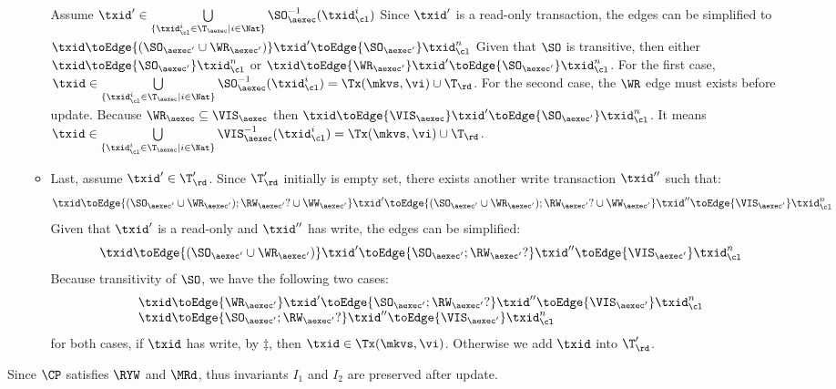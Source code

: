 \begin{itemize}
\begin{itemize}
    Assume  \( \txid' \in \bigcup\limits_{\{\txid_{\cl}^{i} \in \T_{\aexec} \mid i \in \Nat\}} \SO_{\aexec}^{-1}(\txid^i_\cl) \)
    Since \( \txid' \) is a read-only transaction, 
    the edges can be simplified to \( \txid \toEdge{(\SO_{\aexec'} \cup \WR_{\aexec'} )} \txid' \toEdge{\SO_{\aexec'}}  \txid_\cl^n \)
    Given that \( \SO \) is transitive, then  either \( \txid \toEdge{\SO_{\aexec'}} \txid_\cl^n \) or \( \txid \toEdge{\WR_{\aexec'} } \txid' \toEdge{\SO_{\aexec'}}  \txid_\cl^n \).
    For the first case, \( \txid \in \bigcup\limits_{\{\txid_{\cl}^{i} \in \T_{\aexec} \mid i \in \Nat\}} \SO_{\aexec}^{-1}(\txid^i_\cl) = \Tx(\mkvs, \vi) \cup \T_\rd \).
    For the second case, the \( \WR \) edge must exists before update.
    Because \( \WR_\aexec \subseteq \VIS_\aexec \) then  \( \txid \toEdge{\VIS_{\aexec} } \txid' \toEdge{\SO_{\aexec'}}  \txid_\cl^n  \).
    It means \( \txid \in \bigcup\limits_{\{\txid_{\cl}^{i} \in \T_{\aexec} \mid i \in \Nat\}} \VIS_{\aexec}^{-1}(\txid^i_\cl) = \Tx(\mkvs, \vi) \cup \T_\rd \).
    \item 
    Last, assume \( \txid' \in \T'_\rd \).
    Since \( \T'_\rd \) initially is empty set, there exists another write transaction \( \txid'' \) such that:
    \[
        \txid \toEdge{(\SO_{\aexec'} \cup \WR_{\aexec'} ) ; \RW_{\aexec'}? \cup \WW_{\aexec'}} \txid' \toEdge{(\SO_{\aexec'} \cup \WR_{\aexec'} ) ; \RW_{\aexec'}? \cup \WW_{\aexec'}} \txid'' \toEdge{\VIS_{\aexec'}}  \txid_\cl^n
    \]
    Given that \( \txid' \) is a read-only and \( \txid'' \) has write, the edges can be simplified:
    \[
        \txid \toEdge{(\SO_{\aexec'} \cup \WR_{\aexec'} )} \txid' \toEdge{\SO_{\aexec'} ; \RW_{\aexec'}?} \txid'' \toEdge{\VIS_{\aexec'}}  \txid_\cl^n
    \]
    Because transitivity of  \( \SO \), we have the following two cases:
    \[
        \begin{array}{@{}l@{}}
            \txid \toEdge{ \WR_{\aexec'} } \txid' \toEdge{\SO_{\aexec'} ; \RW_{\aexec'}?} \txid'' \toEdge{\VIS_{\aexec'}}  \txid_\cl^n \\
            \txid \toEdge{\SO_{\aexec'} ; \RW_{\aexec'}?} \txid'' \toEdge{\VIS_{\aexec'}}  \txid_\cl^n 
        \end{array}
    \]
    for both cases, if \( \txid \) has write, by \( \ddagger \), then \( \txid \in \Tx(\mkvs, \vi) \).
    Otherwise we add \( \txid \) into \(\T'_\rd \).
    \end{itemize}
\end{itemize}
Since \( \CP \) satisfies \( \RYW \) and \( \MRd \), thus invariants \( I_1 \) and  \( I_2 \) are preserved after update.
    

